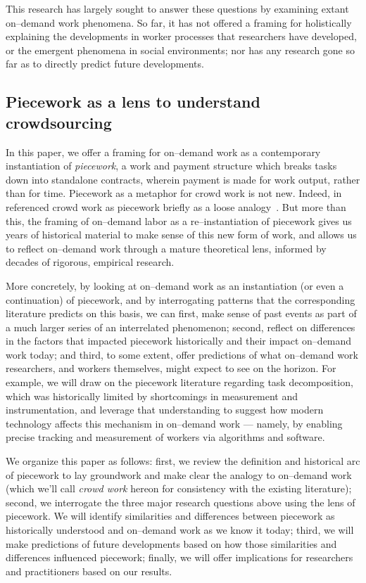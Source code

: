 \documentclass[trackingWork]{subfiles}
\begin{document}
This research has largely sought to answer these questions by examining extant on--demand work phenomena.
So far, it has not offered a framing for holistically explaining
the developments in worker processes that researchers have developed, or
the emergent phenomena in social environments;
nor has any research
gone so far as to directly predict future developments.

\subsection{Piecework as a lens to understand crowdsourcing}
In this paper, we offer a framing for on--demand work as a contemporary instantiation of \textit{piecework},
a work and payment structure which breaks tasks down into standalone contracts,
wherein payment is made for work output, rather than for time.
Piecework as a metaphor for crowd work is not new.
Indeed,
\citeauthor{crowdworkFuture} in \citeyear{crowdworkFuture}
referenced crowd work as piecework briefly
as a loose analogy~\cite{crowdworkFuture}.
But more than this,
the framing of on--demand labor as a re--instantiation of piecework
gives us years of historical material to make sense of this new form of work, and allows us to reflect on--demand work through a mature theoretical lens, informed by decades of rigorous, empirical research.

More concretely, by looking at on--demand work as
an instantiation (or even a continuation) of piecework,
and by interrogating patterns that the corresponding literature predicts
on this basis, we can
first, make sense of past events as part of a much larger series of an interrelated phenomenon;
second, reflect on differences in the factors that impacted piecework historically and their impact on--demand work today;
and third, to some extent, offer predictions of what on--demand work researchers,
and workers themselves,
might expect to see on the horizon.
For example, we will draw on the piecework literature regarding task decomposition,
which was historically limited by shortcomings in measurement and instrumentation, and
leverage that understanding to suggest how modern technology affects this mechanism in on--demand work
--- namely, by enabling precise tracking and measurement of workers via algorithms and software.


We organize this paper as follows:
first, we review the definition and historical arc of piecework
to lay groundwork and make clear the analogy to on--demand work
(which we'll call \textit{crowd work} hereon
for consistency with the existing literature);
second, we interrogate the three major research questions above using the lens of piecework. 
We will identify similarities and differences between piecework as historically understood and
on--demand work as we know it today;
third, we will make predictions of future developments based on how those similarities and differences influenced piecework;
finally, we will offer implications for researchers and practitioners based on our results.


\end{document}
